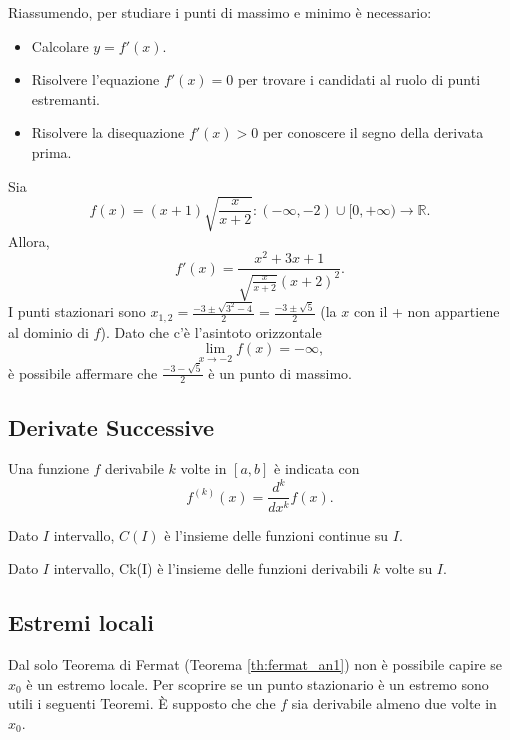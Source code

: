 Riassumendo, per studiare i punti di massimo e minimo è necessario:
\begin{itemize}
    \item Calcolare $y = f'(x)$.
    \item Risolvere l'equazione $f'(x) = 0$ per trovare i candidati al ruolo di punti estremanti.
    \item Risolvere la disequazione $f'(x) > 0$ per conoscere il segno della derivata prima.
\end{itemize}

\begin{example}
    Sia
    \begin{equation*}
        f(x)=(x+1)\sqrt{\frac{x}{x+2}}\colon(-\infty,-2)\cup[0,+\infty)\rightarrow\mathbb R.
    \end{equation*}
    Allora,
    \begin{equation*}
        f'(x)=\frac{x^2+3x+1}{\sqrt{\frac{x}{x+2}}(x+2)^2}.
    \end{equation*}
    I punti stazionari sono $x_{1,2}=\frac{-3\pm\sqrt{3^2-4}}{2}=\frac{-3\pm\sqrt{5}}{2}$ (la $x$ con il + non appartiene al dominio di $f$). Dato che c'è l'asintoto orizzontale
    \begin{equation*}
        \lim_{x\rightarrow -2}f(x)=-\infty,
    \end{equation*}
    è possibile affermare che $\frac{-3-\sqrt{5}}{2}$ è un punto di massimo.
\end{example}


\subsection{Derivate Successive}
Una funzione $f$ derivabile $k$ volte in $[a,b]$ è indicata con
\begin{equation*}
    f^{(k)}(x)=\frac{d^k}{dx^k}f(x).
\end{equation*}

\begin{definition}
    Dato $I$ intervallo, $C(I)$ è l'insieme delle funzioni continue su $I$.
\end{definition}

\begin{definition}
    Dato $I$ intervallo, \gls{Ck(I)} è l'insieme delle funzioni derivabili $k$ volte su $I$.
\end{definition}

\subsection{Estremi locali}\label{ssec:estremi_locali_derivate}
Dal solo Teorema di Fermat (Teorema \ref{th:fermat_an1}) non è possibile capire se $x_0$ è un estremo locale. Per scoprire se un \gls{punto stazionario} è un estremo sono utili i seguenti Teoremi. È supposto che che $f$ sia derivabile almeno due volte in $x_0$.

